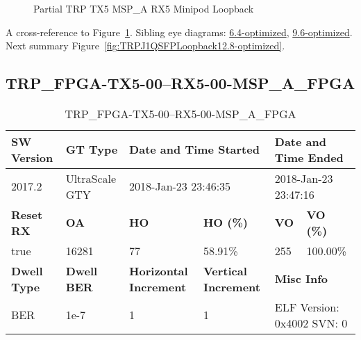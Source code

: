 \begin{figure}[h]
\begin{subfigure}{0.5\textwidth}
\hyperref[sec:TRPFPGATX506RX506MSPAFPGA12.8-optimized]{}
\end{subfigure}\hspace*{\fill}
\begin{subfigure}{0.5\textwidth}
\hyperref[sec:TRPFPGATX507RX507MSPAFPGA12.8-optimized]{}
\end{subfigure}

\caption{Partial TRP TX5 MSP\_A RX5 Minipod Loopback} \label{fig:PartialTRPTX5MSPARX5MinipodLoopback12.8-optimized}
\end{figure}

A cross-reference to Figure~\ref{fig:PartialTRPTX5MSPARX5MinipodLoopback12.8-optimized}.
Sibling eye diagrams: \hyperref[sec:PartialTRPTX5MSPARX5MinipodLoopback6.4-optimized]{6.4-optimized}, \hyperref[sec:PartialTRPTX5MSPARX5MinipodLoopback9.6-optimized]{9.6-optimized}. \\
Next summary Figure~\ref{fig:TRPJ1QSFPLoopback12.8-optimized}.
\clearpage
% 
\subsection{TRP\_FPGA-TX5-00--RX5-00-MSP\_A\_FPGA}\label{sec:TRPFPGATX500RX500MSPAFPGA12.8-optimized}

\begin{table}[h]
\centering
\caption{TRP\_FPGA-TX5-00--RX5-00-MSP\_A\_FPGA}
\label{tab:TRPFPGATX500RX500MSPAFPGA12.8-optimized}
\begin{tabular}{@{}|l|l|l|l|l|l|@{}}
\toprule
\textbf{SW Version}                & \textbf{GT Type}   & \multicolumn{2}{l|}{\textbf{Date and Time Started}}            & \multicolumn{2}{l|}{\textbf{Date and Time Ended}}        \\ \midrule
2017.2                       & UltraScale GTY          & \multicolumn{2}{l|}{2018-Jan-23 23:46:35}                   & \multicolumn{2}{l|}{2018-Jan-23 23:47:16}               \\ \midrule
\textbf{Reset RX}                  & \textbf{OA} & \textbf{HO}   & \textbf{HO (\%)} & \textbf{VO} & \textbf{VO (\%)} \\ \midrule
true & 16281        & 77          & 58.91\%        & 255        & 100.00\%       \\ \midrule
\textbf{Dwell Type}                & \textbf{Dwell BER} & \textbf{Horizontal Increment} & \textbf{Vertical Increment}    & \multicolumn{2}{l|}{\textbf{Misc Info}}                  \\ \midrule
BER                            & 1e-7        & 1        & 1           & \multicolumn{2}{l|}{ELF Version: 0x4002 SVN: 0}                         \\ \bottomrule
\end{tabular}
\end{table}

